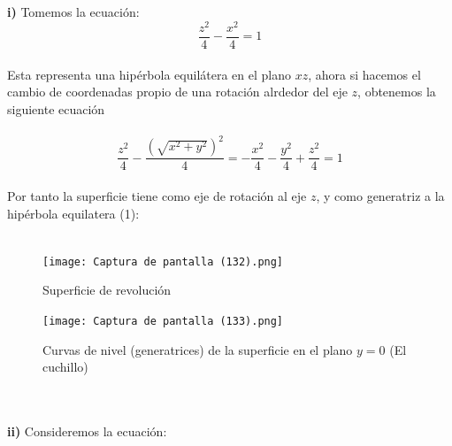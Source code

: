 \documentclass[11pt,letterpaper]{article}
\begin{document}
\,\\
\,\\
    \textbf{i)}\,\,Tomemos la ecuaci\'on:\,\\
    \begin{equation}
        \frac{z^2}{4}-\frac{x^2}{4}=1
    \end{equation}\,\\
    Esta representa una hip\'erbola equil\'atera en el plano $xz$, ahora si hacemos el cambio
    de coordenadas propio de una rotaci\'on alrdedor del eje $z$, obtenemos la siguiente ecuaci\'on\,\\
    \,\\
    \begin{equation*}
        \frac{z^2}{4}-\frac{(\sqrt{x^2+y^2})^2}{4}=-\frac{x^2}{4}-\frac{y^2}{4}+\frac{z^2}{4}=1
    \end{equation*}\,\\
    Por tanto la superficie tiene como eje de rotaci\'on al eje $z$, y como generatriz a la hip\'erbola equilatera (1):\,\\
    \,\\
     \begin{figure}[htb]
    \centering
    \texttt{[image: Captura de pantalla (132).png]}
    \caption{Superficie de revoluci\'on}
    \label{Cono rebanado}
     \end{figure}
      \begin{figure}[htb]
    \centering
    \texttt{[image: Captura de pantalla (133).png]}
    \caption{Curvas de nivel (generatrices) de la superficie en el plano $y=0$ (El cuchillo)}
    \label{Cono rebanado}
     \end{figure}\,\\
     \newpage
     \,\\
     \textbf{ii)}\,\,Consideremos la ecuaci\'on:\,\\
     \,\\
\end{document}
